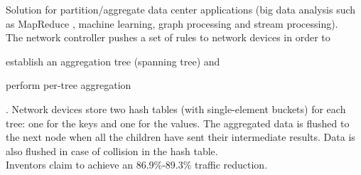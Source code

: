 Solution for partition/aggregate data center applications (big data analysis such as MapReduce \cite{mapreduce}, machine learning, graph processing and stream processing).\\
The network controller pushes a set of rules to network devices in order to
\begin{mylist}
    \item establish an aggregation tree (spanning tree) and
    \item perform per-tree aggregation
\end{mylist}. Network devices store two hash tables (with single-element buckets) for each tree: one for the keys and one for the values. The aggregated data is flushed to the next node when all the children have sent their intermediate results. Data is also flushed in case of collision in the hash table.\\
Inventors claim to achieve an 86.9\%-89.3\% traffic reduction.